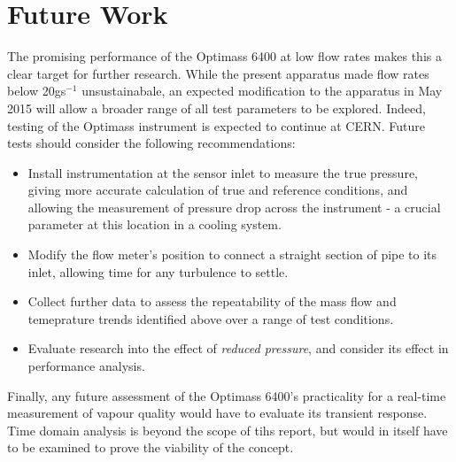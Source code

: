 \documentclass{report}
\begin{document}
\chapter{Future Work} \label{further research}
The promising performance of the Optimass 6400 at low flow rates makes this a clear target for further research. While the present apparatus made flow rates below 20gs$^{-1}$ unsustainabale, an expected modification to the apparatus in May 2015 will allow a broader range of all test parameters to be explored. Indeed, testing of the Optimass instrument is expected to continue at CERN. Future tests should consider the following recommendations:
\begin{itemize}
\item{Install instrumentation at the sensor inlet to measure the true pressure, giving more accurate calculation of true and reference conditions, and allowing the measurement of pressure drop across the instrument - a crucial parameter at this location in a cooling system.}
\item{Modify the flow meter's position to connect a straight section of pipe to its inlet, allowing time for any turbulence to settle.}
\item{Collect further data to assess the repeatability of the mass flow and temeprature trends identified above over a range of test conditions.}
\item{Evaluate research into the effect of \textit{reduced pressure}, and consider its effect in performance analysis.}
\end{itemize}
Finally, any future assessment of the Optimass 6400's practicality for a real-time measurement of vapour quality would have to evaluate its transient response. Time domain analysis is beyond the scope of tihs report, but would in itself have to be examined to prove the viability of the concept.
\end{document}
